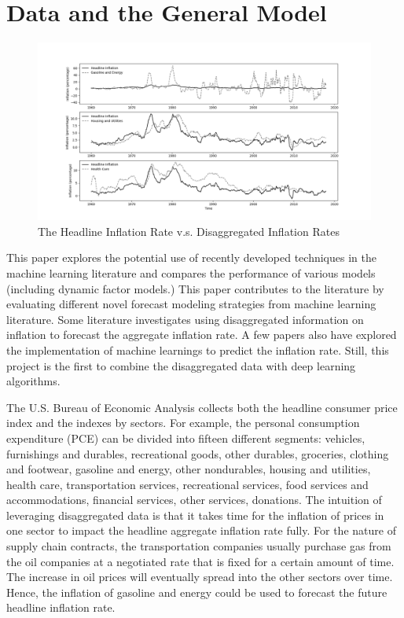 \documentclass[10pt,twocolumn,letterpaper]{article}
\begin{document}
\section{Data and the General Model}
\begin{figure}[t]
\begin{center}
\includegraphics[scale=0.5]{../../Python/Times_Series.png}
\caption{The Headline Inflation Rate v.s. Disaggregated Inflation Rates}
\end{center}
\end{figure}

This paper explores the potential use of recently developed techniques in the machine learning literature and compares the performance of various models (including dynamic factor models.) This paper contributes to the literature by evaluating different novel forecast modeling strategies from machine learning literature. Some literature investigates using disaggregated information on inflation to forecast the aggregate inflation rate. A few papers also have explored the implementation of machine learnings to predict the inflation rate. Still, this project is the first to combine the disaggregated data with deep learning algorithms.

The U.S. Bureau of Economic Analysis collects both the headline consumer price index and the indexes by sectors. For example, the personal consumption expenditure (PCE) can be divided into fifteen different segments: vehicles, furnishings and durables, recreational goods, other durables, groceries, clothing and footwear, gasoline and energy, other nondurables, housing and utilities, health care, transportation services, recreational services, food services and accommodations, financial services, other services, donations. The intuition of leveraging disaggregated data is that it takes time for the inflation of prices in one sector to impact the headline aggregate inflation rate fully. For the nature of supply chain contracts, the transportation companies usually purchase gas from the oil companies at a negotiated rate that is fixed for a certain amount of time. The increase in oil prices will eventually spread into the other sectors over time. Hence, the inflation of gasoline and energy could be used to forecast the future headline inflation rate. 
\end{document}
